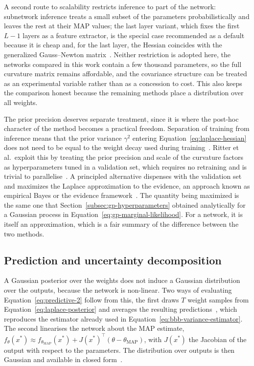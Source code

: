 A second route to scalability restricts inference to part of the network: subnetwork inference treats a small subset of the parameters probabilistically and leaves the rest at their MAP values; the last layer variant, which fixes the first $L-1$ layers as a feature extractor, is the special case recommended as a default because it is cheap and, for the last layer, the Hessian coincides with the generalized Gauss--Newton matrix~\cite{daxberger2021}. Neither restriction is adopted here, the networks compared in this work contain a few thousand parameters, so the full curvature matrix remains affordable, and the covariance structure can be treated as an experimental variable rather than as a concession to cost. This also keeps the comparison honest because the remaining methods place a distribution over all weights.

The prior precision deserves separate treatment, since it is where the post-hoc character of the method becomes a practical freedom. Separation of training from inference means that the prior variance $\gamma^2$ entering Equation~\eqref{eq:laplace-hessian} does not need to be equal to the weight decay used during training~\cite{daxberger2021}. Ritter et al.\ exploit this by treating the prior precision and scale of the curvature factors as hyperparameters tuned in a validation set, which requires no retraining and is trivial to parallelise~\cite{ritter2018}. A principled alternative dispenses with the validation set and maximizes the Laplace approximation to the evidence, an approach known as empirical Bayes or the evidence framework~\cite{daxberger2021}. The quantity being maximized is the same one that Section~\ref{subsec:gp-hyperparameters} obtained analytically for a Gaussian process in Equation~\eqref{eq:gp-marginal-likelihood}. For a network, it is itself
an approximation, which is a fair summary of the difference between the two methods.

\subsection{Prediction and uncertainty decomposition}
\label{subsec:laplace-prediction}

A Gaussian posterior over the weights does not induce a Gaussian distribution over the outputs, because the network is non-linear. Two ways of evaluating Equation~\eqref{eq:predictive-2} follow from this, the first draws $T$ weight samples from Equation~\eqref{eq:laplace-posterior} and averages the resulting predictions~\cite{ritter2018}, which reproduces the estimator already used in Equation~\eqref{eq:bbb-variance-estimator}. The second linearises the network about the MAP estimate, $f_\theta(x^\ast) \approx f_{\theta_{\mathrm{MAP}}}(x^\ast) + J(x^\ast)^{\!\top}(\theta - \theta_{\mathrm{MAP}})$, with $J(x^\ast)$ the Jacobian of the output with respect to the parameters. The distribution over outputs is then Gaussian and available in closed form~\cite{daxberger2021}.

